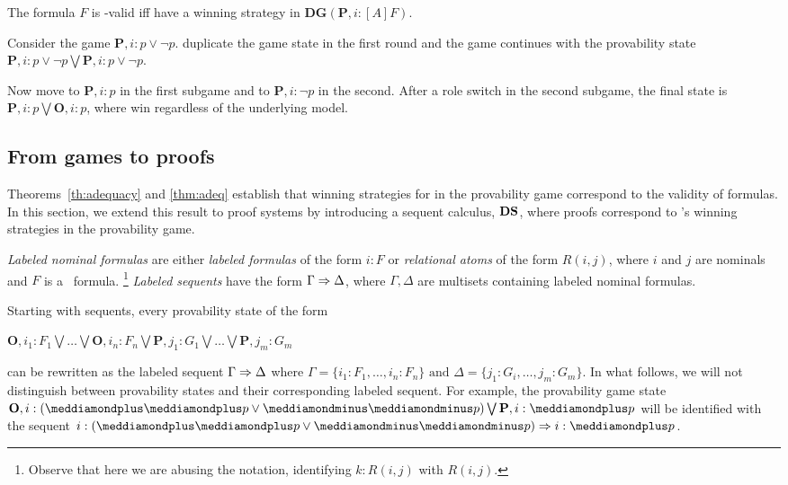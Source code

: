 \begin{corollary}
The formula $F $ is  \PNL-valid iff \Ic have a winning strategy in $\mathbf{DG}(\mathbf{P},i:[A]F )$.
\end{corollary}

\begin{example}
Consider  the game $\mathbf{P},i: p \vee \neg p$.
\Ic duplicate the game state in the first round and the
game continues with the provability state $\mathbf{P},i: p \vee \neg
p\bigvee \mathbf{P},i: p \vee \neg p$. 

Now \Ic move to $\mathbf{P},i: p$ in the
first subgame and to $\mathbf{P},i:\neg p$ in the second. After a role switch
in the second subgame, the final state is $\mathbf{P},i: p \bigvee
\mathbf{O},i: p$, where \Ic win regardless of the underlying model.
\end{example}

\subsection{From games to proofs}\label{sec:proofs}

Theorems~\ref{th:adequacy} and \ref{thm:adeq} establish that winning strategies for \Me in the provability game correspond to the validity of formulas. In this section, we extend this result to proof systems by introducing a sequent calculus, 
$\mathbf{DS}$, where proofs correspond to \My's winning strategies in the provability game.

{\em Labeled nominal formulas} are either \emph{labeled formulas} of
the form $i: F $ or \emph{relational atoms} of the form $R(i,j)$,
where $i$ and $j$ are nominals and $ F $ is a \PNL~formula.%
\footnote{Observe that here we are abusing the notation, identifying $k:R(i,j)$ with $R(i,j)$.} \emph{Labeled sequents} have the form $\Gamma \Rightarrow \Delta$, where
$\Gamma,\Delta$ are multisets containing labeled nominal formulas.

Starting with sequents, every provability state of the form
\begin{center}
$
\mathbf{O},i_1:  F_1\bigvee \ldots \bigvee \mathbf{O},i_n:  F_n\bigvee\mathbf{P},j_1: G_1 \bigvee \ldots \bigvee \mathbf{P},j_m: G_m
$
\end{center}
 can be rewritten as the labeled sequent $\Gamma \Rightarrow \Delta$ where
$
\Gamma =\{i_1: F_1, \ldots, i_n: F_n\}\mbox{ and } \Delta =\{j_1: G_i,\ldots,j_m: G_m\}
$. 
In what follows, we will not distinguish between provability states and their corresponding labeled sequent. For example,
the provability game state
$\mathbf{O},i:(\dplus\dplus p \vee \dminus\dminus p)\bigvee\mathbf{P},i: \dplus p$
will be identified with the sequent  
$i:(\dplus\dplus p \vee \dminus\dminus p)\seq i: \dplus p$.

